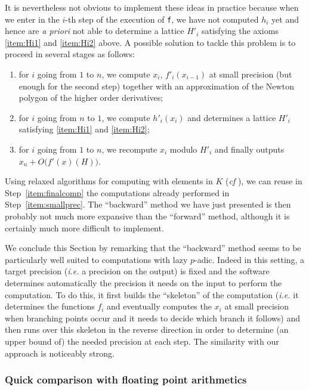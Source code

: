 \documentclass{lms}
\begin{document}
It is nevertheless not obvious to implement these ideas in practice
because when we enter in the $i$-th step of the execution of {\tt f},
we have not computed $h_i$ yet and hence are \emph{a priori} not able
to determine a lattice $H'_i$ satisfying the axioms \eqref{item:Hi1}
and \eqref{item:Hi2} above.
A possible solution to tackle this problem is to proceed in several
stages as follows: 
\begin{enumerate}[(1)]
\item \label{item:smallprec}
for $i$ going from $1$ to $n$, we compute $x_i$, $f'_i(x_{i-1})$ 
at small precision (but enough for the second step) together with an
approximation of the Newton polygon of the higher order derivatives;
\item \label{item:determineHi}
for $i$ going from $n$ to $1$, we compute $h'_i(x_i)$ and
determines a lattice $H'_i$ satisfying \eqref{item:Hi1} and 
\eqref{item:Hi2};
\item \label{item:finalcomp}
for $i$ going from $1$ to $n$, we recompute $x_i$ modulo $H'_i$
and finally outputs $x_n + O\big(f'(x)(H)\big)$.
\end{enumerate}
Using relaxed algorithms for computing with elements in $K$ (\emph{cf} 
\cite{}), we can reuse in Step~\eqref{item:finalcomp} the computations 
already performed in Step~\eqref{item:smallprec}. The ``backward'' method 
we have just presented is then probably not much more expansive than the 
``forward'' method, although it is certainly much more difficult to 
implement. 

We conclude this Section by remarking that the ``backward'' method seems 
to be particularly well suited to computations with lazy $p$-adic. Indeed 
in this setting, a target precision (\emph{i.e.} a precision on the 
output) is fixed and the software determines automatically the precision 
it needs on the input to perform the computation. To do this, it first 
builds the ``skeleton'' of the computation (\emph{i.e.} it determines the 
functions $f_i$ and eventually computes the $x_i$ at small precision when 
branching points occur and it needs to decide which branch it follows) 
and then runs over this skeleton in the reverse direction in order to 
determine (an upper bound of) the needed precision at each step. The 
similarity with our approach is noticeably strong.

\subsubsection*{Quick comparison with floating point arithmetics}
\end{document}
